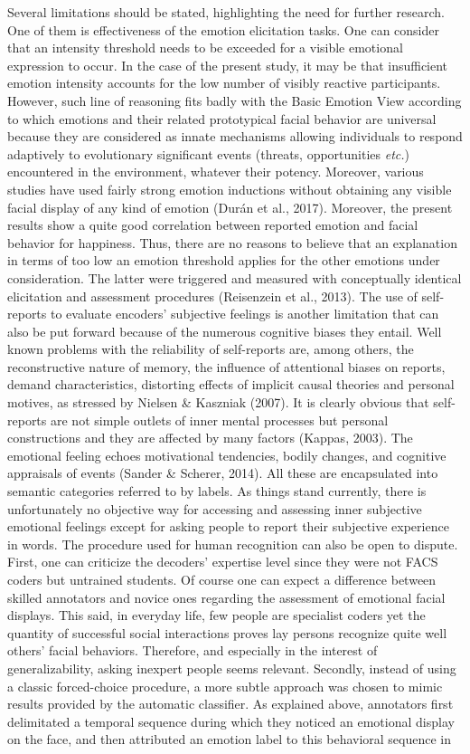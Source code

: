 \documentclass[
  english,
  doc]{apa7}
\begin{document}
Several limitations should be stated, highlighting the need for further research. One of them is effectiveness of the emotion elicitation tasks. One can consider that an intensity threshold needs to be exceeded for a visible emotional expression to occur. In the case of the present study, it may be that insufficient emotion intensity accounts for the low number of visibly reactive participants. However, such line of reasoning fits badly with the Basic Emotion View according to which emotions and their related prototypical facial behavior are universal because they are considered as innate mechanisms allowing individuals to respond adaptively to evolutionary significant events (threats, opportunities \emph{etc.}) encountered in the environment, whatever their potency. Moreover, various studies have used fairly strong emotion inductions without obtaining any visible facial display of any kind of emotion (Durán et al., 2017). Moreover, the present results show a quite good correlation between reported emotion and facial behavior for happiness. Thus, there are no reasons to believe that an explanation in terms of too low an emotion threshold applies for the other emotions under consideration. The latter were triggered and measured with conceptually identical elicitation and assessment procedures (Reisenzein et al., 2013). The use of self-reports to evaluate encoders' subjective feelings is another limitation that can also be put forward because of the numerous cognitive biases they entail. Well known problems with the reliability of self-reports are, among others, the reconstructive nature of memory, the influence of attentional biases on reports, demand characteristics, distorting effects of implicit causal theories and personal motives, as stressed by Nielsen \& Kaszniak (2007). It is clearly obvious that self-reports are not simple outlets of inner mental processes but personal constructions and they are affected by many factors (Kappas, 2003). The emotional feeling echoes motivational tendencies, bodily changes, and cognitive appraisals of events (Sander \& Scherer, 2014). All these are encapsulated into semantic categories referred to by labels. As things stand currently, there is unfortunately no objective way for accessing and assessing inner subjective emotional feelings except for asking people to report their subjective experience in words. The procedure used for human recognition can also be open to dispute. First, one can criticize the decoders' expertise level since they were not FACS coders but untrained students. Of course one can expect a difference between skilled annotators and novice ones regarding the assessment of emotional facial displays. This said, in everyday life, few people are specialist coders yet the quantity of successful social interactions proves lay persons recognize quite well others' facial behaviors. Therefore, and especially in the interest of generalizability, asking inexpert people seems relevant. Secondly, instead of using a classic forced-choice procedure, a more subtle approach was chosen to mimic results provided by the automatic classifier. As explained above, annotators first delimitated a temporal sequence during which they noticed an emotional display on the face, and then attributed an emotion label to this behavioral sequence in 
\end{document}
